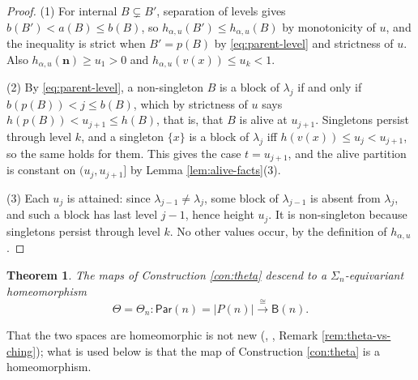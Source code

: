 \documentclass[12pt]{amsart}
\newtheorem{theorem}[subsection]{Theorem}
\theoremstyle{definition}
\theoremstyle{remark}
\newcommand{\Par}{\mathsf{Par}}
\newcommand{\BC}{\mathsf{B}}                     %
\newcommand{\Thet}{\Theta}                       %
\begin{document}
\begin{proof}
(1) For internal $B\subsetneq B'$, separation of levels gives $b(B')<a(B)\leq b(B)$, so $h_{\alpha,u}(B')\leq h_{\alpha,u}(B)$ by monotonicity of $u$, and the inequality is strict when $B' = p(B)$ by \eqref{eq:parent-level} and strictness of $u$. Also $h_{\alpha,u}(\mathbf{n}) \geq u_1 > 0$ and $h_{\alpha,u}(v(x)) \leq u_k < 1$.

(2) By \eqref{eq:parent-level}, a non-singleton $B$ is a block of $\lambda_j$ if and only if $b(p(B)) < j \leq b(B)$, which by strictness of $u$ says $h(p(B)) < u_{j+1}\leq h(B)$, that is, that $B$ is alive at $u_{j+1}$. Singletons persist through level $k$, and a singleton $\{x\}$ is a block of $\lambda_j$ iff $h(v(x))\leq u_j < u_{j+1}$, so the same holds for them. This gives the case $t = u_{j+1}$, and the alive partition is constant on $(u_j,u_{j+1}]$ by Lemma \ref{lem:alive-facts}(3).

(3) Each $u_j$ is attained: since $\lambda_{j-1}\neq\lambda_j$, some block of $\lambda_{j-1}$ is absent from $\lambda_j$, and such a block has last level $j-1$, hence height $u_j$. It is non-singleton because singletons persist through level $k$. No other values occur, by the definition of $h_{\alpha,u}$.
\end{proof}

\begin{theorem}\label{thm:levelling}
The maps of Construction \ref{con:theta} descend to a $\Sigma_n$-equivariant homeomorphism
\[ \Thet = \Thet_n \colon \Par(n) = |P(n)| \xrightarrow{\;\cong\;} \BC(n).\]
\end{theorem}

That the two spaces are homeomorphic is not new (\cite{Fresse-Koszul}, \cite{Heu-Moer-trees}, Remark \ref{rem:theta-vs-ching}); what is used below is that the map of Construction \ref{con:theta} is a homeomorphism.
\end{document}
